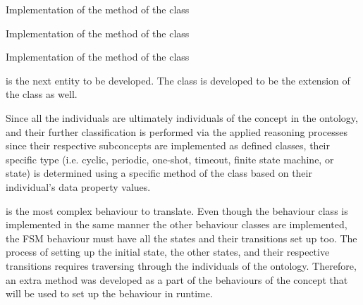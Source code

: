 \begin{listing}
    \caption{Implementation of the  method of the  class}
    \label{lst: mago-ag agent get_related_roles_and_behaviours}
\end{listing}

\begin{listing}
    \caption{Implementation of the  method of the  class}
    \label{lst: mago-ag agent render_agent_instantiation}
\end{listing}

\begin{listing}
    \caption{Implementation of the  method of the  class}
    \label{lst: mago-ag agent render_agent_import}
\end{listing}



%
is the next entity to be developed. The  class is developed to be the extension of the  class as well.

Since all the  individuals are ultimately individuals of the  concept in the ontology, and their further classification is performed via the applied reasoning processes since their respective subconcepts are implemented as defined classes, their specific type (i.e. cyclic, periodic, one-shot, timeout, finite state machine, or state) is determined
%
using a specific method of the  class based on their individual's data property values.
%

 is the most complex behaviour to translate. Even though the behaviour class is implemented in the same manner the other behaviour classes are implemented, the \ac{FSM} behaviour must have all the states
%
and their transitions set up too. The process of setting up the initial state, the other states,
%
and their respective transitions requires traversing through the individuals of the ontology. Therefore, an extra method
%
was developed as a part of the behaviours of the  concept
%
that will be used to set up the behaviour in runtime.


